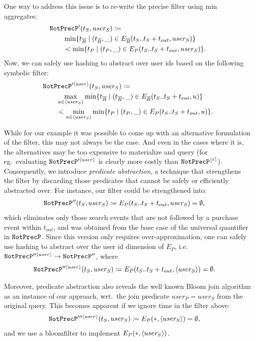 One way to address this issue is to re-write the precise filter using min
aggregates:
\begin{align*}
&
\texttt{NotPrecP}'(t_S, user_S) \coloneq 
\\
&\qquad
\min \{ t_{\overline{R}} \mid (t_{\overline{R}}, \_) \in E_{\overline{R}}(t_S..t_S + t_{out}, user_S) \}
\\
&\qquad
< \min \{ t_P \mid (t_P, \_) \in E_P(t_S..t_S + t_{out}, user_S) \}.
\end{align*}
Now, we can safely use hashing to abstract over user ids based on the following
symbolic filter:
\begin{align*}
&
\texttt{NotPrecP}'^{\langle user \rangle}(t_S, user_S) \coloneq 
\\
&\qquad
\max_{u \in \langle user_S \rangle}
\min \{ t_{\overline{R}} \mid (t_{\overline{R}}, \_) \in E_{\overline{R}}(t_S..t_S + t_{out}, u) \}
\\
&\qquad
< 
\min_{u \in \langle user_S \rangle}
\min \{ t_P \mid (t_P, \_) \in E_P(t_S..t_S + t_{out}, u) \}.
\end{align*}


While for our example it was possible to come up with an alternative formulation
of the filter, this may not always be the case. 
And even in the cases where it is, the alternatives may be too expensive to
materialize and query (for eg.\ evaluating $\texttt{NotPrecP}'^{\langle user \rangle}$ is
clearly more costly than $\texttt{NotPrecP}^{\lfloor t \rceil}$).
Consequently, 
we introduce {\em predicate abstraction}, a technique
that strengthens the filter by discarding those predicates that cannot be safely
or efficiently abstracted over.
For instance, our filter could be strengthened into:
\begin{align*}
&
\texttt{NotPrecP}''(t_S, user_S) \coloneq 
E_P(t_S..t_S + t_{out}, user_S) = \emptyset,
\end{align*} 
which eliminates only those search events that are not followed by a purchase
event within $t_{out}$, and was obtained from the base case of
the universal quantifier in $\texttt{NotPrecP}$.
Since this version only requires over-approximation, one can safely use hashing
to abstract over the user id dimension of $E_P$, i.e.\ 
$\texttt{NotPrecP}''^{\langle user \rangle} \rightarrow \texttt{NotPrecP}''$, where
\begin{align*}
&
\texttt{NotPrecP}''^{\langle user \rangle}(t_S, user_S) \coloneq 
E_P(t_S..t_S + t_{out}, \langle user_S \rangle) = \emptyset .
\end{align*}

Moreover, predicate abstraction also reveals the well known Bloom
join algorithm as an instance of our approach, wrt.\ the join
predicate $user_P = user_S$ from the original query. 
This becomes apparent if we ignore time in the filter above:
\begin{align*}
&
\texttt{NotPrecP}'''^{\langle user \rangle}(t_S, user_S) \coloneq 
E_P(*, \langle user_S \rangle) = \emptyset,
\end{align*}
and we use a bloomfilter to implement $E_P(*, \langle user_S \rangle)$.

